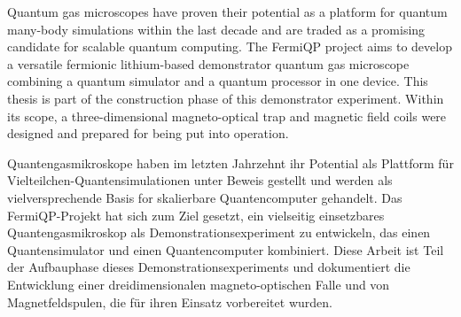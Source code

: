 Quantum gas microscopes have proven their potential as a platform for quantum many-body simulations within the last decade and are traded as a promising candidate for scalable quantum computing. The FermiQP project aims to develop a versatile fermionic lithium-based demonstrator quantum gas microscope combining a quantum simulator and a quantum processor in one device. This thesis is part of the construction phase of this demonstrator experiment. Within its scope, a three-dimensional magneto-optical trap and magnetic field coils were designed and prepared for being put into operation.

\vspace{2cm}

Quantengasmikroskope haben im letzten Jahrzehnt ihr Potential als Plattform für Vielteilchen-Quantensimulationen unter Beweis gestellt und werden als vielversprechende Basis for skalierbare Quantencomputer gehandelt. Das FermiQP-Projekt hat sich zum Ziel gesetzt, ein vielseitig einsetzbares Quantengasmikroskop als Demonstrationsexperiment zu entwickeln, das einen Quantensimulator und einen Quantencomputer kombiniert. Diese Arbeit ist Teil der Aufbauphase dieses Demonstrationsexperiments und dokumentiert die Entwicklung einer dreidimensionalen magneto-optischen Falle und von Magnetfeldspulen, die für ihren Einsatz vorbereitet wurden.